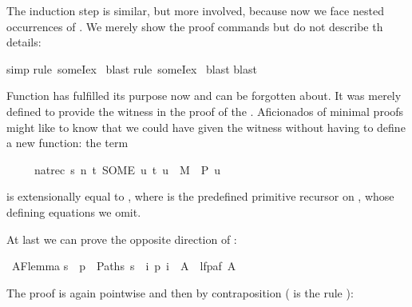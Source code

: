 \begin{isabellebody}
\begin{isamarkuptxt}
The induction step is similar, but more involved, because now we face nested occurrences of
. We merely show the proof commands but do not describe th details:%
\end{isamarkuptxt}%
simp{\isacharparenright}\isanewline
{}rule\ someIex{\isacharparenright}\isanewline
\ blast{\isacharparenright}\isanewline
{}rule\ someIex{\isacharparenright}\isanewline
\ blast{\isacharparenright}\isanewline
{}blast{\isacharparenright}\isanewline
{}%
\begin{isamarkuptext}%
Function  has fulfilled its purpose now and can be forgotten
about. It was merely defined to provide the witness in the proof of the
. Aficionados of minimal proofs might like to know
that we could have given the witness without having to define a new function:
the term
\begin{isabelle}%
\ \ \ \ \ nat{\isacharunderscore}rec\ s\ {\isacharparenleft}{\isasymlambda}n\ t{\isachardot}\ SOME\ u{\isachardot}\ {\isacharparenleft}t{\isacharcomma}\ u{\isacharparenright}\ {\isasymin}\ M\ {\isasymand}\ P\ u{\isacharparenright}%
\end{isabelle}
is extensionally equal to ,
where  is the predefined primitive recursor on , whose defining
equations we omit.%
\end{isamarkuptext}%
%
\begin{isamarkuptext}%
At last we can prove the opposite direction of :%
\end{isamarkuptext}%
\ AF{\isacharunderscore}lemma\isanewline
{\isachardoublequote}{\isacharbraceleft}s{\isachardot}\ {\isasymforall}\ p\ {\isasymin}\ Paths\ s{\isachardot}\ {\isasymexists}\ i{\isachardot}\ p\ i\ {\isasymin}\ A{\isacharbraceright}\ {\isasymsubseteq}\ lfp{\isacharparenleft}af\ A{\isacharparenright}{\isachardoublequote}%
\begin{isamarkuptxt}%
\noindent
The proof is again pointwise and then by contraposition ( is the rule
):%

\end{isamarkuptxt}
\end{isabellebody}
